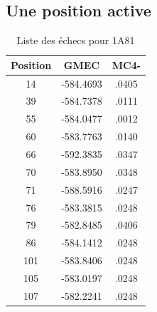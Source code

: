 \documentclass[a4paper,12pt]{article}
\begin{document}
   \subsection{ Une position active}


    \begin{table}[h]
      \centering

      \begin{tabular}{|c|c|c|}


        \hline
        Position & GMEC & MC4- \\
        \hline
        14 & -584.4693 & .0405 \\
        39 & -584.7378 & .0111 \\
        55 & -584.0477 & .0012 \\
        60 & -583.7763 & .0140 \\
        66 & -592.3835 & .0347 \\
        70 & -583.8950 & .0348 \\
        71 & -588.5916 & .0247 \\
        76 & -583.3815 & .0248 \\
        79 & -582.8485 & .0406 \\
        86 & -584.1412 & .0248 \\
        101 & -583.8406 & .0248 \\
        105 & -583.0197 & .0248 \\
        107 & -582.2241 & .0248 \\

        \hline


      \end{tabular}      
      \caption{Liste des échecs pour 1A81}
      \label{tab_best_ener_no_active}      
    \end{table}
\end{document}
